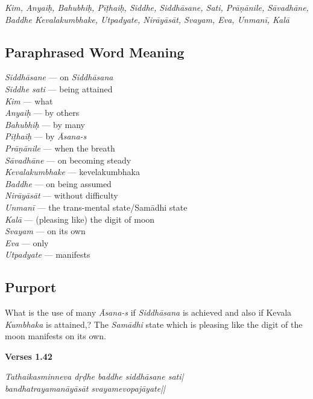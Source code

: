 \textit{Kim, Anyaiḥ, Bahubhiḥ, Pīṭhaiḥ, Siddhe, Siddhāsane, Sati, Prāṇānile, Sāvadhāne, Baddhe Kevalakumbhake, Utpadyate, Nirāyāsāt, Svayam, Eva, Unmanī,  Kalā}

\subsection*{Paraphrased Word Meaning}

\begin{multicols}{2}
\itemsep=0pt
\textit{Siddhāsane} ---  on \textit{Siddhāsana}  \\
\textit{Siddhe sati} --- being attained   \\
\textit{Kim} --- what   \\
\textit{Anyaiḥ} --- by others   \\
\textit{Bahubhiḥ} --- by many  \\
\textit{Pīṭhaiḥ} ---  by \textit{Āsana-s} \\
\textit{Prāṇānile} ---	when the breath\\
\textit{Sāvadhāne} ---  on becoming steady	 \\
\textit{Kevalakumbhake} --- kevelakumbhaka  \\
\textit{Baddhe} ---  on being assumed \\
\textit{Nirāyāsāt} --- without difficulty  \\
\textit{Unmanī} ---  the trans-mental state/Samādhi state \\
\textit{Kalā} --- (pleasing like) the digit of moon  \\
\textit{Svayam} --- on its own \\
\textit{Eva} --- only  \\
\textit{Utpadyate} --- manifests
\end{multicols}

\subsection*{Purport}

What is the use of many \textit{Āsana-s} if \textit{Siddhāsana} is achieved and also if Kevala \textit{Kumbhaka} is attained,? The \textit{Samādhi} state which is pleasing like the digit of the moon manifests on its own. 

\noindent \textbf{Verses 1.42}

\begin{shloka}
\textit{Tathaikasminneva dṛḍhe baddhe siddhāsane sati|\\
bandhatrayamanāyāsāt svayamevopajāyate||}
\end{shloka}

